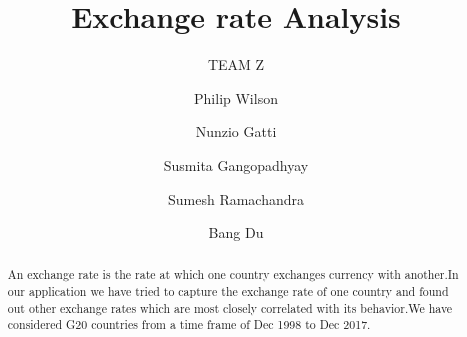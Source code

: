 \documentclass[acmtog,authorversion]{acmart}
\begin{document}
\title{Exchange rate Analysis} 

 \subtitle{TEAM Z}


\author{Philip Wilson}

\author{Nunzio Gatti}

\author{Susmita Gangopadhyay} 

\author{Sumesh Ramachandra}

\author{Bang Du}



\begin{abstract}
An exchange rate is the rate at which one country exchanges currency with another.In our application we have tried to capture the exchange rate of one country and found out other exchange rates which are most closely correlated with its behavior.We have considered G20 countries from a time frame of Dec 1998 to Dec 2017.
\end{abstract}










\maketitle



\end{document}
